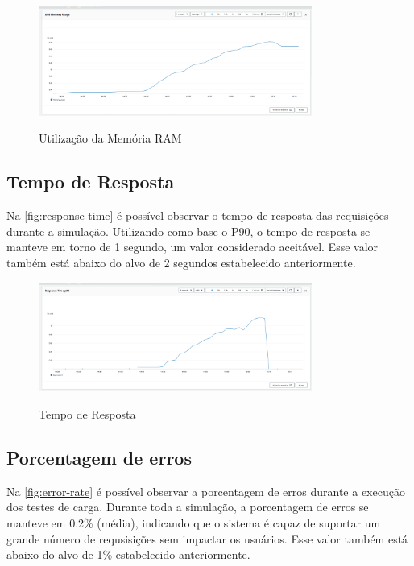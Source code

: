 \begin{figure}[H]
    \centering
    \caption{Utilização da Memória RAM}
    \includegraphics[width=0.8\textwidth]{media/memory-usage.png}
    \label{fig:memory-utilization}
\end{figure}

\subsection{Tempo de Resposta}
Na \autoref{fig:response-time} é possível observar o tempo de resposta das requisições durante a simulação. Utilizando como base o P90, o tempo de resposta se manteve em torno de 1 segundo, um valor considerado aceitável. Esse valor também está abaixo do alvo de 2 segundos estabelecido anteriormente.

\begin{figure}[H]
    \centering
    \caption{Tempo de Resposta}
    \includegraphics[width=0.8\textwidth]{media/response-time.png}
    \label{fig:response-time}
\end{figure}

\subsection{Porcentagem de erros}
Na \autoref{fig:error-rate} é possível observar a porcentagem de erros durante a execução dos testes de carga. Durante toda a simulação, a porcentagem de erros se manteve em 0.2\% (média), indicando que o sistema é capaz de suportar um grande número de requsisições sem impactar os usuários. Esse valor também está abaixo do alvo de 1\% estabelecido anteriormente.

